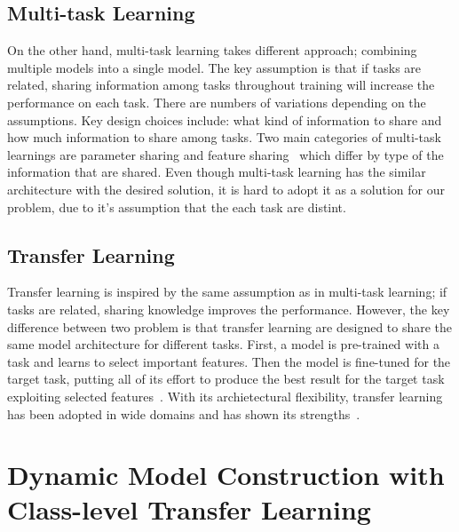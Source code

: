\documentclass{article}
\begin{document}
\subsection{Multi-task Learning}
On the other hand, multi-task learning takes different approach; combining multiple models into a single model. The key assumption is that if tasks are related, sharing information among tasks throughout training will increase the performance on each task. There are numbers of variations depending on the assumptions. Key design choices include: what kind of information to share and how much information to share among tasks. Two main categories of multi-task learnings are parameter sharing and feature sharing~\cite{ruder2017overview, Caruana1993MultitaskLA, duong2015low, lu2017fully} which differ by type of the information that are shared. Even though multi-task learning has the similar architecture with the desired solution, it is hard to adopt it as a solution for our problem, due to it's assumption that the each task are distint.

\subsection{Transfer Learning}

Transfer learning is inspired by the same assumption as in multi-task learning; if tasks are related, sharing knowledge improves the performance. However, the key difference between two problem is that transfer learning are designed to share the same model architecture for different tasks. First, a model is pre-trained with a task and learns to select important features. Then the model is fine-tuned for the target task, putting all of its effort to produce the best result for the target task exploiting selected features~\cite{yosinski2014transferable}. With its archietectural flexibility, transfer learning has been adopted in wide domains and has shown its strengths~\cite{raina2007self, egan2004effects, glorot2011domain}.

\section{Dynamic Model Construction with Class-level Transfer Learning}
\end{document}
